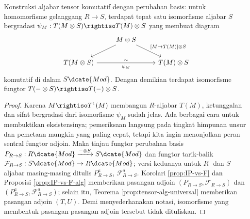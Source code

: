 \begin{lemma}\label{prop:tensor-alg-basechange}
	Konstruksi aljabar tensor komutatif dengan perubahan basis: untuk homomorfisme gelanggang $R \to S$, terdapat tepat satu isomorfisme aljabar $S$ bergradasi $\psi_M: T(M \otimes S) \rightiso T(M) \otimes S$ yang membuat diagram
	\[\begin{tikzcd}
		& M \otimes S \arrow[ld] \arrow[rd, "{[M \to T(M)] \otimes S}"] & \\
		T(M \otimes S) \arrow[rr, "\sim", "\psi_M"'] & & T(M) \otimes S
	\end{tikzcd}\]
	komutatif di dalam $S\dcate{Mod}$. Dengan demikian terdapat isomorfisme fungtor $T(- \otimes S) \rightiso T(-) \otimes S$.
\end{lemma}
\begin{proof}
	Karena $M \rightiso T^1(M)$ membangun $R$-aljabar $T(M)$, ketunggalan dan sifat bergradasi dari isomorfisme $\psi_M$ sudah jelas. Ada berbagai cara untuk membuktikan eksistensinya; pemeriksaan langsung pada tingkat himpunan unsur dan pemetaan mungkin yang paling cepat, tetapi kita ingin menonjolkan peran sentral fungtor adjoin. Maka tinjau fungtor perubahan basis $P_{R \to S}: R\dcate{Mod} \xrightarrow{- \otimes S} S\dcate{Mod}$ dan fungtor tarik-balik $\mathcal{F}_{R \to S}: S\dcate{Mod} \to R\dcate{Mod}$; versi keduanya untuk $R$- dan $S$-aljabar masing-masing ditulis $P_{R \to S}^a$, $\mathcal{F}^a_{R \to S}$. Korolari \ref{prop:IP-vs-F} dan Proposisi \ref{prop:IP-vs-F-alg} memberikan pasangan adjoin $(P_{R \to S}, \mathcal{F}_{R \to S})$ dan $(P_{R \to S}^a, \mathcal{F}_{R \to S}^a)$; selain itu, Teorema \ref{prop:tensor-alg-universal} memberikan pasangan adjoin $(T, U)$. Demi menyederhanakan notasi, isomorfisme yang membentuk pasangan-pasangan adjoin tersebut tidak dituliskan.


\end{proof}
